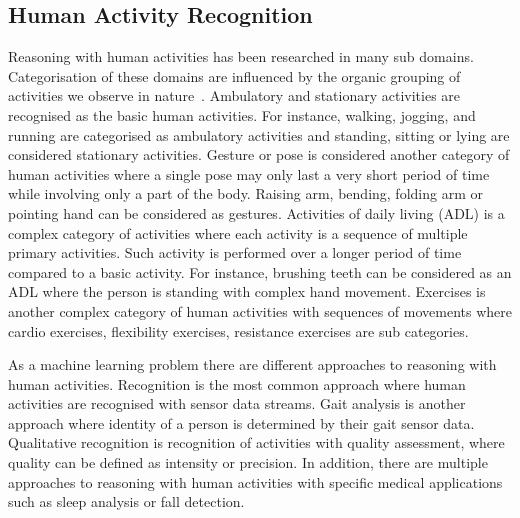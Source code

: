 \documentclass[runningheads]{llncs}
\begin{document}
\subsection{Human Activity Recognition}
Reasoning with human activities has been researched in many sub domains. Categorisation of these domains are influenced by the organic grouping of activities we observe in nature~\cite{lara2013survey}. Ambulatory and stationary activities are recognised as the basic human activities. For instance, walking, jogging, and running are categorised as ambulatory activities and standing, sitting or lying are considered stationary activities. Gesture or pose is considered another category of human activities where a single pose may only last a very short period of time while involving only a part of the body. Raising arm, bending, folding arm or pointing hand can be considered as gestures. Activities of daily living (ADL) is a complex category of activities where each activity is a sequence of multiple primary activities. Such activity is performed over a longer period of time compared to a basic activity. For instance, brushing teeth can be considered as an ADL where the person is standing with complex hand movement. Exercises is another complex category of human activities with sequences of movements where cardio exercises, flexibility exercises, resistance exercises are sub categories. 

As a machine learning problem there are different approaches to reasoning with human activities. Recognition is the most common approach where human activities are recognised with sensor data streams. Gait analysis is another approach where identity of a person is determined by their gait sensor data. Qualitative recognition is recognition of activities with quality assessment, where quality can be defined as intensity or precision. In addition, there are multiple approaches to reasoning with human activities with specific medical applications such as sleep analysis or fall detection.
\end{document}
